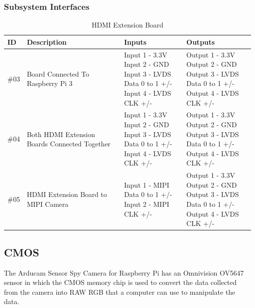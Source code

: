 \subsubsection{Subsystem Interfaces}
\begin{table}[H]
\caption{HDMI Extension Board}
\begin{center}
	\begin{tabular}{ | p{1cm} | p{6cm} | p{3cm} | p{3cm} |}
	\hline
	ID & Description & Inputs & Outputs \\ \hline
	\#03 & Board Connected To Raspberry Pi 3 & \pbox{3cm}{Input 1 - 3.3V \\ Input 2 - GND \\ Input 3 - LVDS Data 0 to 1 +/- \\ Input 4 - LVDS CLK +/-} & \pbox{3cm}{Output 1 - 3.3V \\ Output 2 - GND \\ Output 3 - LVDS Data 0 to 1 +/- \\ Output 4 - LVDS CLK +/-} \\ \hline
	\#04 & Both HDMI Extension Boards Connected Together & \pbox{3cm}{Input 1 - 3.3V \\ Input 2 - GND \\ Input 3 - LVDS Data 0 to 1 +/- \\ Input 4 - LVDS CLK +/-} & \pbox{3cm}{Output 1 - 3.3V \\ Output 2 - GND \\ Output 3 - LVDS Data 0 to 1 +/- \\ Output 4 - LVDS CLK +/-} \\ \hline
	\#05 & HDMI Extension Board to MIPI Camera & \pbox{3cm}{Input 1 - MIPI Data 0 to 1 +/- \\ Input 2 - MIPI CLK +/-} & \pbox{3cm}{Output 1 - 3.3V \\ Output 2 - GND \\ Output 3 - LVDS Data 0 to 1 +/- \\ Output 4 - LVDS CLK +/-} \\ \hline
	\end{tabular}
\end{center}
\end{table} 


\subsection{CMOS}
The Arducam Sensor Spy Camera for Raspberry Pi has an Omnivision OV5647 sensor in which the CMOS memory chip is used to convert the data collected from the camera into RAW RGB that a computer can use to manipulate the data.

